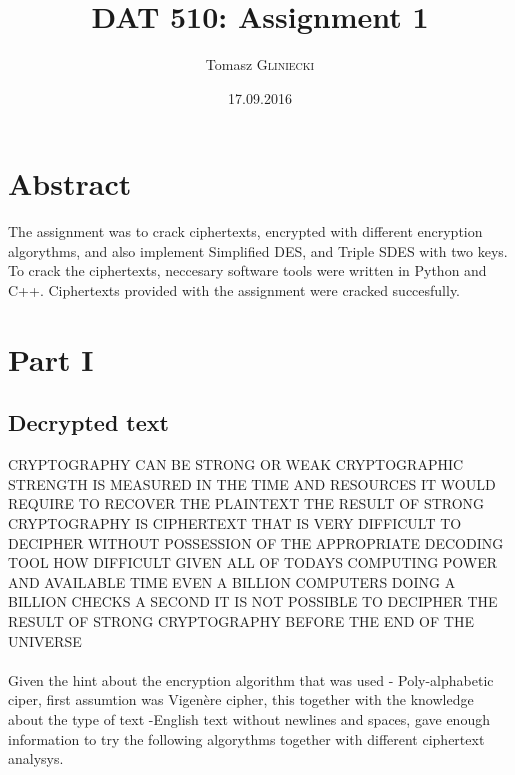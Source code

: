 \documentclass[12pt]{report}
\title{DAT 510: Assignment 1} %
\author{Tomasz \textsc{Gliniecki}} %
\date{17.09.2016} %
\begin{document}
\maketitle %



\section*{Abstract}
The assignment was to crack ciphertexts, encrypted with different encryption algorythms, and also implement Simplified DES, and Triple SDES with two keys. To crack the ciphertexts, neccesary software tools were written in Python and C++. Ciphertexts provided with the assignment were cracked succesfully.

\section*{Part I}

\subsection*{Decrypted text}
CRYPTOGRAPHY CAN BE STRONG OR WEAK CRYPTOGRAPHIC STRENGTH IS MEASURED IN THE TIME AND RESOURCES IT WOULD REQUIRE TO RECOVER THE PLAINTEXT THE RESULT OF STRONG CRYPTOGRAPHY IS CIPHERTEXT THAT IS VERY DIFFICULT TO DECIPHER WITHOUT POSSESSION OF THE APPROPRIATE DECODING TOOL HOW DIFFICULT GIVEN ALL OF TODAYS COMPUTING POWER AND AVAILABLE TIME EVEN A BILLION COMPUTERS DOING A BILLION CHECKS A SECOND IT IS NOT POSSIBLE TO DECIPHER THE RESULT OF STRONG CRYPTOGRAPHY BEFORE THE END OF THE UNIVERSE
\\\\
Given the hint about the encryption algorithm that was used - Poly-alphabetic ciper, first assumtion was Vigenère cipher, this together with the knowledge about the type of text -English text without newlines and spaces, gave enough information to try the following algorythms together with different ciphertext analysys. 
\end{document}
